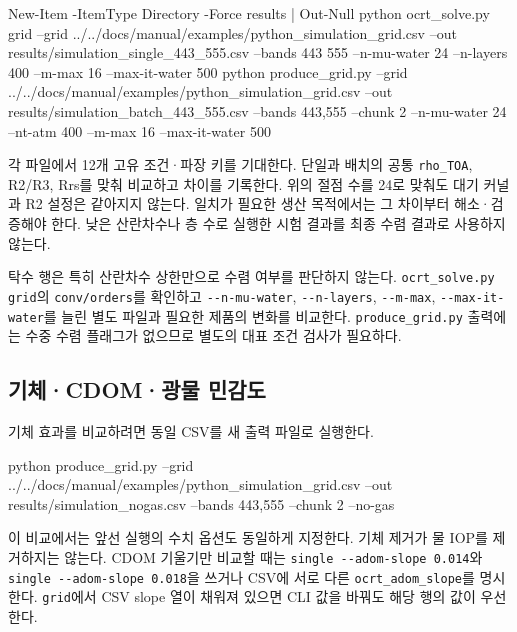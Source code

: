 \begin{ManualCode}
New-Item -ItemType Directory -Force results | Out-Null
python ocrt_solve.py grid --grid ../../docs/manual/examples/python_simulation_grid.csv --out results/simulation_single_443_555.csv --bands 443 555 --n-mu-water 24 --n-layers 400 --m-max 16 --max-it-water 500
python produce_grid.py --grid ../../docs/manual/examples/python_simulation_grid.csv --out results/simulation_batch_443_555.csv --bands 443,555 --chunk 2 --n-mu-water 24 --nt-atm 400 --m-max 16 --max-it-water 500
\end{ManualCode}

각 파일에서 12개 고유 조건·파장 키를 기대한다. 단일과 배치의 공통 \texttt{rho\_\allowbreak{}TOA}, R2/R3, Rrs를 맞춰 비교하고 차이를 기록한다. 위의 절점 수를 24로 맞춰도 대기 커널과 R2 설정은 같아지지 않는다. 일치가 필요한 생산 목적에서는 그 차이부터 해소·검증해야 한다. 낮은 산란차수나 층 수로 실행한 시험 결과를 최종 수렴 결과로 사용하지 않는다.

탁수 행은 특히 산란차수 상한만으로 수렴 여부를 판단하지 않는다. \texttt{ocrt\_\allowbreak{}solve.\allowbreak{}py grid}의 \texttt{conv/\allowbreak{}orders}를 확인하고 \texttt{-\allowbreak{}-\allowbreak{}n-\allowbreak{}mu-\allowbreak{}water}, \texttt{-\allowbreak{}-\allowbreak{}n-\allowbreak{}layers}, \texttt{-\allowbreak{}-\allowbreak{}m-\allowbreak{}max}, \texttt{-\allowbreak{}-\allowbreak{}max-\allowbreak{}it-\allowbreak{}water}를 늘린 별도 파일과 필요한 제품의 변화를 비교한다. \texttt{produce\_\allowbreak{}grid.\allowbreak{}py} 출력에는 수중 수렴 플래그가 없으므로 별도의 대표 조건 검사가 필요하다.

\subsection{기체·CDOM·광물 민감도}
\label{sec:auto:06_python_batch:7.4}
기체 효과를 비교하려면 동일 CSV를 새 출력 파일로 실행한다.


\begin{ManualCode}
python produce_grid.py --grid ../../docs/manual/examples/python_simulation_grid.csv --out results/simulation_nogas.csv --bands 443,555 --chunk 2 --no-gas
\end{ManualCode}

이 비교에서는 앞선 실행의 수치 옵션도 동일하게 지정한다. 기체 제거가 물 IOP를 제거하지는 않는다. CDOM 기울기만 비교할 때는 \texttt{single -\allowbreak{}-\allowbreak{}adom-\allowbreak{}slope 0.\allowbreak{}014}와 \texttt{single -\allowbreak{}-\allowbreak{}adom-\allowbreak{}slope 0.\allowbreak{}018}을 쓰거나 CSV에 서로 다른 \texttt{ocrt\_\allowbreak{}adom\_\allowbreak{}slope}를 명시한다. \texttt{grid}에서 CSV slope 열이 채워져 있으면 CLI 값을 바꿔도 해당 행의 값이 우선한다.

